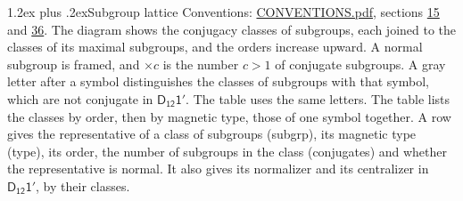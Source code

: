 \documentclass[10pt,a4paper]{article}
\makeatletter
\renewcommand\section{\@startsection{section}{1}{\z@}{-3ex plus -1ex minus -.2ex}%
  {1.2ex plus .2ex}{\normalfont\large\sffamily\bfseries\color{parttitle}}}
\numberwithin{equation}{section}
\newcommand{\grp}[1]{\mathsf{#1}}
\makeatother
\begin{document}
\section{Subgroup lattice}\label{s:subgroups}
Conventions: \href{../../CONVENTIONS.pdf}{CONVENTIONS.pdf}, sections \href{../../../rotation/CONVENTIONS.pdf\#conv.15}{15} and \href{../../CONVENTIONS.pdf\#conv.36}{36}.
The diagram shows the conjugacy classes of subgroups, each joined to the classes of its maximal subgroups, and the orders increase upward. \label{n:index.conjugates.c}\label{n:mark.conjugates}A normal subgroup is framed, and ${\times}c$ is the number $c > 1$ of conjugate subgroups. \label{n:mark.letter}A gray letter after a symbol distinguishes the classes of subgroups with that symbol, which are not conjugate in $\grp{D_{12}1'}$. The table uses the same letters. The table lists the classes by order, then by magnetic type, those of one symbol together. \label{n:head.subgroup}\label{n:head.magnetic.type}\label{n:head.order}\label{n:head.conjugates}\label{n:head.normal}A row gives the representative of a class of subgroups (subgrp), its magnetic type (type), its order, the number of subgroups in the class (conjugates) and whether the representative is normal. \label{n:head.normalizer}\label{n:head.centralizer}It also gives its normalizer and its centralizer in $\grp{D_{12}1'}$, by their classes. 
\end{document}

